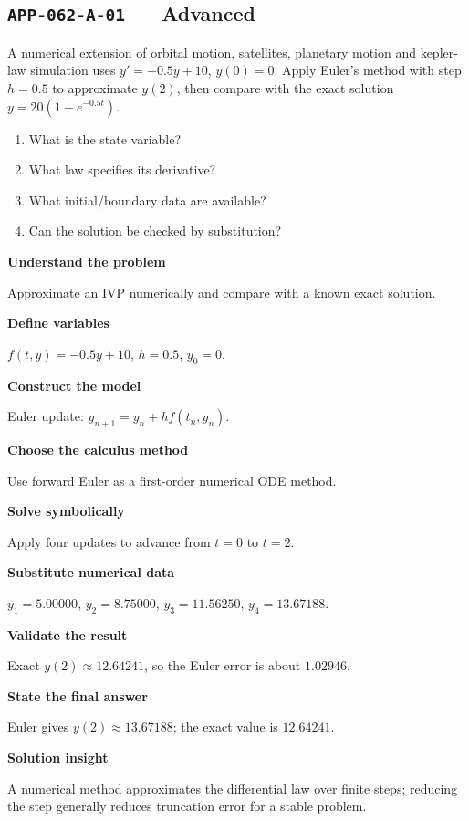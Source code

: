 \documentclass[11pt]{book}
\newcommand{\pid}[1]{\texttt{#1}}
\begin{document}
\subsection*{\pid{APP-062-A-01} — Advanced}
\begin{problembox}
A numerical extension of orbital motion, satellites, planetary motion and kepler-law simulation uses $y'=-0.5y+10$, $y(0)=0$. Apply Euler's method with step $h=0.5$ to approximate $y(2)$, then compare with the exact solution $y=20(1-e^{-0.5t})$.
\end{problembox}
\begin{promptbox}\begin{enumerate}
\item What is the state variable?
\item What law specifies its derivative?
\item What initial/boundary data are available?
\item Can the solution be checked by substitution?
\end{enumerate}\end{promptbox}
\begin{solutionbox}
\textbf{Understand the problem}\par Approximate an IVP numerically and compare with a known exact solution.\par\medskip
\textbf{Define variables}\par $f(t,y)=-0.5y+10$, $h=0.5$, $y_0=0$.\par\medskip
\textbf{Construct the model}\par Euler update: $y_{n+1}=y_n+h f(t_n,y_n)$.\par\medskip
\textbf{Choose the calculus method}\par Use forward Euler as a first-order numerical ODE method.\par\medskip
\textbf{Solve symbolically}\par Apply four updates to advance from $t=0$ to $t=2$.\par\medskip
\textbf{Substitute numerical data}\par $y_1=5.00000$, $y_2=8.75000$, $y_3=11.56250$, $y_4=13.67188$.\par\medskip
\textbf{Validate the result}\par Exact $y(2)\approx 12.64241$, so the Euler error is about $1.02946$.\par\medskip
\textbf{State the final answer}\par Euler gives $y(2)\approx 13.67188$; the exact value is $12.64241$.\par\medskip
\textbf{Solution insight}\par A numerical method approximates the differential law over finite steps; reducing the step generally reduces truncation error for a stable problem.\par\medskip
\end{solutionbox}
\end{document}
